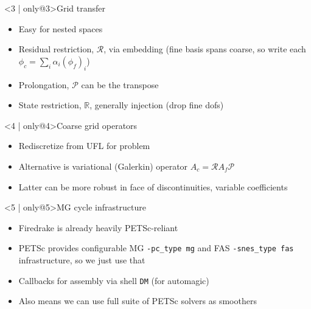 \documentclass[presentation]{beamer}
\begin{document}
\begin{frame}[fragile,t]
\begin{block}
\begin{center}
    \end{center}
  \end{block}
  \begin{block}<3 | only@3>{Grid transfer}
    \begin{itemize}
    \item Easy for nested spaces
    \item Residual restriction, $\mathcal{R}$, via embedding (fine basis
      spans coarse, so write each $\phi_c = \sum_i \alpha_i
      (\phi_f)_i$)
    \item Prolongation, $\mathcal{P}$ can be the transpose
    \item State restriction, $\mathbb{R}$, generally injection (drop
      fine dofs)
    \end{itemize}
  \end{block}
  \begin{block}<4 | only@4>{Coarse grid operators}
    \begin{itemize}
    \item Rediscretize from UFL for problem
    \item Alternative is variational (Galerkin) operator $A_c =
      \mathcal{R} A_f \mathcal{P}$
    \item Latter can be more robust in face of discontinuities,
      variable coefficients
    \end{itemize}
  \end{block}
  \begin{block}<5 | only@5>{MG cycle infrastructure}
    \begin{itemize}
    \item Firedrake is already heavily PETSc-reliant
    \item PETSc provides configurable MG \verb|-pc_type mg| and FAS
      \verb|-snes_type fas| infrastructure, so we just use that
    \item Callbacks for assembly via shell \verb|DM| (for automagic)
    \item Also means we can use full suite of PETSc solvers as smoothers
    \end{itemize}
  \end{block}
\end{frame}
\end{document}
